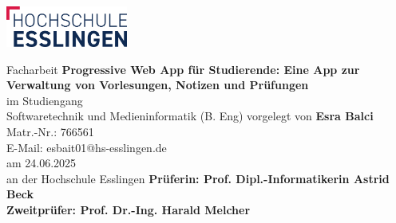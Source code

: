 \documentclass[12pt,ngerman,parskip=half,bibliography=totoc,titlepage]{scrreprt}
\begin{document}
\begin{titlepage}
  \includegraphics[width=4cm]{images/hochschule_logo.png}\par\vspace{2cm}
  Facharbeit \newline \newline \newline
  {\large\textbf{Progressive Web App für Studierende: Eine App zur Verwaltung von Vorlesungen, Notizen und Prüfungen}}\\[1cm]
  im Studiengang\\
  Softwaretechnik und Medieninformatik (B. Eng)\newline \newline \newline
  vorgelegt von\newline \newline
    \textbf{Esra Balci}\\
    Matr.-Nr.: 766561\\
    E-Mail: esbait01@hs-esslingen.de\\
    am 24.06.2025\\ 
    an der Hochschule Esslingen \newline \newline
    \vspace{2ex} %
    \noindent\makebox[\textwidth]{\rule{\textwidth}{0.5pt}}
    \vspace{2ex}
    {\textbf{Prüferin: Prof. Dipl.-Informatikerin Astrid Beck \\
    Zweitprüfer: Prof. Dr.-Ing. Harald Melcher
    }}

\end{titlepage}

\tableofcontents

\cleardoublepage
{}
{}
\listoffigures

\cleardoublepage
{}
{}
\listoftables

\cleardoublepage




% 

% 


\cleardoublepage
{}
\printbibliography[heading=bibintoc]
\end{document}
